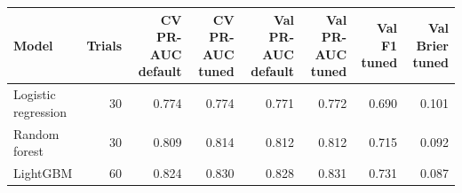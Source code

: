 \begin{tabular}{lrrrrrrr}
\toprule
Model & Trials & CV PR-AUC default & CV PR-AUC tuned & Val PR-AUC default & Val PR-AUC tuned & Val F1 tuned & Val Brier tuned \\
\midrule
Logistic regression & 30 & 0.774 & 0.774 & 0.771 & 0.772 & 0.690 & 0.101 \\
Random forest & 30 & 0.809 & 0.814 & 0.812 & 0.812 & 0.715 & 0.092 \\
LightGBM & 60 & 0.824 & 0.830 & 0.828 & 0.831 & 0.731 & 0.087 \\
\bottomrule
\end{tabular}
